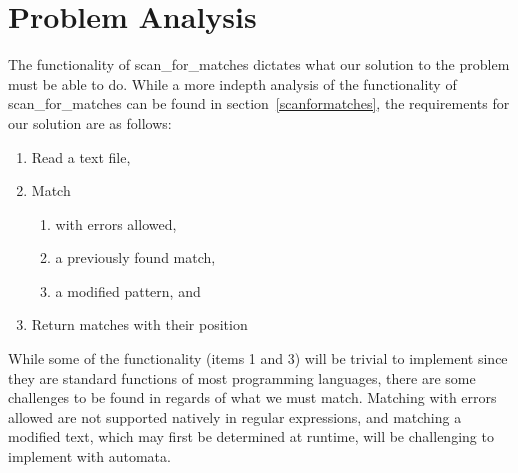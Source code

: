 \section{Problem Analysis}\label{probanal}

The functionality of scan\_for\_matches dictates what our solution to the 
problem must be able to do. While a more indepth analysis of the functionality 
of scan\_for\_matches can be found in section~\ref{scanformatches}, 
the requirements for our solution are as follows:
\begin{enumerate}
\item Read a text file,
\item Match
\begin{enumerate}
\item with errors allowed,
\item a previously found match,
\item a modified pattern, and
\end{enumerate}
\item Return matches with their position
\end{enumerate}
While some of the functionality (items 1 and 3) will be trivial to implement 
since they are standard functions of most programming languages, there are 
some challenges to be found in regards of what we must match. Matching with 
errors allowed are not supported natively in regular expressions, and 
matching a modified text, which may first be determined at runtime, will be 
challenging to implement with automata.
